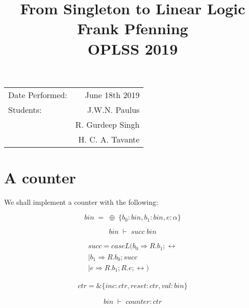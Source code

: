 \documentclass{article}
\title{From Singleton to Linear Logic \\ Frank Pfenning \\ OPLSS 2019} %
\begin{document}
\maketitle %

\begin{center}
\begin{tabular}{l r}
Date Performed: & June 18th 2019 \\ %
Students: & J.W.N. Paulus  \\
& R. Gurdeep Singh \\ %
& H. C. A. Tavante
\end{tabular}
\end{center}



\section{A counter}

We shall implement a counter with the following:

\[
\; bin\; =\; \oplus\; \{ b_0: bin, b_1:bin, e:\alpha \}\; 
\]

\[
\; bin\; \vdash\; succ\; bin\; 
\]

\begin{equation}
\begin{split}
succ = caseL( b_0 \Rightarrow R . b_1; \leftrightarrow \\
            | b_1 \Rightarrow R . b_0; succ \\
            | e \Rightarrow R . b_1; R . e; \leftrightarrow )
\end{split}
\end{equation}

\begin{equation}
\begin{split}
ctr = \& \{ inc:ctr, reset:ctr, val:bin \}
\end{split}
\end{equation}

\[
\; bin\; \vdash\; counter:ctr\; 
\]
\end{document}
